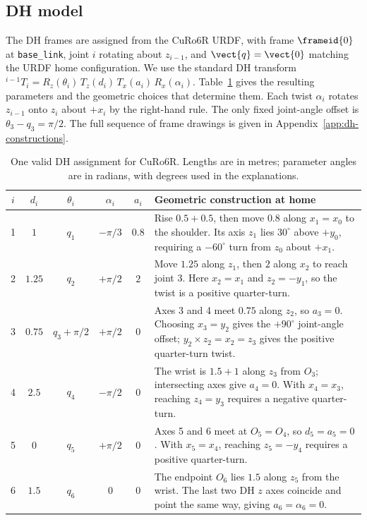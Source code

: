 \subsection{DH model}
\label{sec:dh}

The DH frames are assigned from the CuRo6R URDF, with frame $\frameid{0}$ at
\texttt{base\_link}, joint $i$ rotating about $z_{i-1}$, and $\vect{q}=\vect{0}$ matching the
URDF home configuration. We use the standard DH transform
${}^{i-1}\!T_i=R_z(\theta_i)\,T_z(d_i)\,T_x(a_i)\,R_x(\alpha_i)$.
Table~\ref{tab:dh} gives the resulting parameters and the geometric choices
that determine them. Each twist $\alpha_i$ rotates $z_{i-1}$ onto $z_i$ about $+x_i$
by the right-hand rule.
The only fixed joint-angle offset is $\theta_3-q_3=\pi/2$.
The full sequence of frame drawings is given in Appendix~\ref{app:dh-constructions}.

\begin{table}[!ht]
\centering
\caption{One valid DH assignment for CuRo6R. Lengths are in metres; parameter angles are in radians, with degrees used in the explanations.}
\label{tab:dh}
\small
\setlength{\tabcolsep}{5pt}
\renewcommand{\arraystretch}{1.30}
\begin{tabularx}{\linewidth}{@{}c c c c c X@{}}
\toprule
$i$ & $d_i$ & $\theta_i$ & $\alpha_i$ & $a_i$ & Geometric construction at home \\
\midrule
1 & $1$ & $q_1$ & $-\pi/3$ & $0.8$
  & Rise $0.5+0.5$, then move $0.8$ along $x_1=x_0$ to the shoulder.
    Its axis $z_1$ lies $30^\circ$ above $+y_0$, requiring a $-60^\circ$
    turn from $z_0$ about $+x_1$. \\
2 & $1.25$ & $q_2$ & $+\pi/2$ & $2$
  & Move $1.25$ along $z_1$, then $2$ along $x_2$ to reach joint 3.
    Here $x_2=x_1$ and $z_2=-y_1$, so the twist is a positive quarter-turn. \\
3 & $0.75$ & $q_3+\pi/2$ & $+\pi/2$ & $0$
  & Axes 3 and 4 meet $0.75$ along $z_2$, so $a_3=0$.
    Choosing $x_3=y_2$ gives the $+90^\circ$ joint-angle offset;
    $y_2\times z_2=x_2=z_3$ gives the positive quarter-turn twist. \\
4 & $2.5$ & $q_4$ & $-\pi/2$ & $0$
  & The wrist is $1.5+1$ along $z_3$ from $O_3$; intersecting axes give $a_4=0$.
    With $x_4=x_3$, reaching $z_4=y_3$ requires a negative quarter-turn. \\
5 & $0$ & $q_5$ & $+\pi/2$ & $0$
  & Axes 5 and 6 meet at $O_5=O_4$, so $d_5=a_5=0$.
    With $x_5=x_4$, reaching $z_5=-y_4$ requires a positive quarter-turn. \\
6 & $1.5$ & $q_6$ & $0$ & $0$
  & The endpoint $O_6$ lies $1.5$ along $z_5$ from the wrist.
    The last two DH $z$ axes coincide and point the same way, giving $a_6=\alpha_6=0$. \\
\bottomrule
\end{tabularx}
\end{table}

